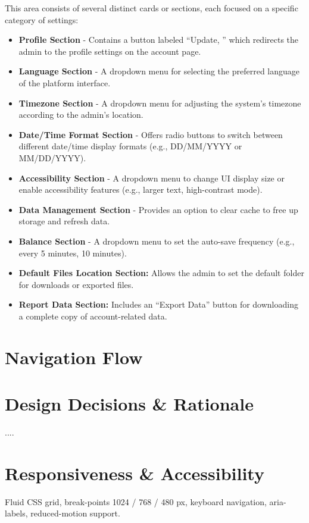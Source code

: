 \documentclass[11pt,a4paper]{article}
\begin{document}
	This area consists of several distinct cards or sections, each focused on a specific category of settings:
	\begin{itemize}
		\item \textbf{Profile Section} - Contains a button labeled ``Update, '' which redirects the admin to the profile settings on the account page.
		\item \textbf{Language Section} - A dropdown menu for selecting the preferred language of the platform interface.
		\item \textbf{Timezone Section} - A dropdown menu for adjusting the system's timezone according to the admin’s location.
		\item \textbf{Date/Time Format Section} - Offers radio buttons to switch between different date/time display formats (e.g., DD/MM/YYYY or MM/DD/YYYY).
		\item \textbf{Accessibility Section} - A dropdown menu to change UI display size or enable accessibility features (e.g., larger text, high-contrast mode).
		\item \textbf{Data Management Section} - Provides an option to clear cache to free up storage and refresh data.
		\item \textbf{Balance Section} - A dropdown menu to set the auto-save frequency (e.g., every 5 minutes, 10 minutes).
		\item \textbf{Default Files Location Section:} Allows the admin to set the default folder for downloads or exported files.
		\item \textbf{Report Data Section:} Includes an ``Export Data'' button for downloading a complete copy of account-related data.
	\end{itemize}
	
	
	
	\section{Navigation Flow}\label{sec:navigation-flow}

	\section{Design Decisions \& Rationale}\label{sec:design-decisions-&-rationale}
	....
	\section{Responsiveness \& Accessibility}\label{sec:responsiveness-&-accessibility}
	Fluid CSS grid, break-points 1024 / 768 / 480 px, keyboard navigation, aria-labels, reduced-motion support.
	
\end{document}
